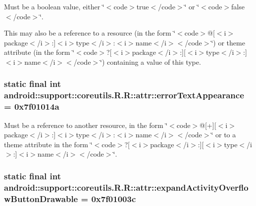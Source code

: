 Must be a boolean value, either \char`\"{}$<$code$>$true$<$/code$>$\char`\"{} or \char`\"{}$<$code$>$false$<$/code$>$\char`\"{}. 

This may also be a reference to a resource (in the form \char`\"{}$<$code$>$@\mbox{[}$<$i$>$package$<$/i$>$:\mbox{]}$<$i$>$type$<$/i$>$:$<$i$>$name$<$/i$>$$<$/code$>$\char`\"{}) or theme attribute (in the form \char`\"{}$<$code$>$?\mbox{[}$<$i$>$package$<$/i$>$:\mbox{]}\mbox{[}$<$i$>$type$<$/i$>$:\mbox{]}$<$i$>$name$<$/i$>$$<$/code$>$\char`\"{}) containing a value of this type. \hypertarget{classandroid_1_1support_1_1coreutils_1_1_r_1_1attr_72a9a55f5d756b831839f7e8a72389fe}{
\subsubsection[{errorTextAppearance}]{\setlength{\rightskip}{0pt plus 5cm}static final int android::support::coreutils.R.R::attr::errorTextAppearance = 0x7f01014a}}
\label{classandroid_1_1support_1_1coreutils_1_1_r_1_1attr_72a9a55f5d756b831839f7e8a72389fe}


Must be a reference to another resource, in the form \char`\"{}$<$code$>$@\mbox{[}+\mbox{]}\mbox{[}$<$i$>$package$<$/i$>$:\mbox{]}$<$i$>$type$<$/i$>$:$<$i$>$name$<$/i$>$$<$/code$>$\char`\"{} or to a theme attribute in the form \char`\"{}$<$code$>$?\mbox{[}$<$i$>$package$<$/i$>$:\mbox{]}\mbox{[}$<$i$>$type$<$/i$>$:\mbox{]}$<$i$>$name$<$/i$>$$<$/code$>$\char`\"{}. \hypertarget{classandroid_1_1support_1_1coreutils_1_1_r_1_1attr_0ec8193fabd24b5bb315bc61a9b91764}{
\subsubsection[{expandActivityOverflowButtonDrawable}]{\setlength{\rightskip}{0pt plus 5cm}static final int android::support::coreutils.R.R::attr::expandActivityOverflowButtonDrawable = 0x7f01003c}}
\label{classandroid_1_1support_1_1coreutils_1_1_r_1_1attr_0ec8193fabd24b5bb315bc61a9b91764}


